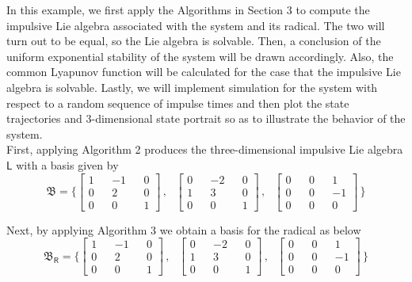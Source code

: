 \documentclass[11pt,a4paper]{article}
\begin{document}
In this example, we first apply the Algorithms in Section 3 to compute the impulsive Lie algebra associated with the system and its radical. The two will turn out to be equal, so the Lie algebra is solvable. Then, a conclusion of the uniform exponential stability of the system will be drawn accordingly. Also, the common Lyapunov function will be calculated for the case that the impulsive Lie algebra is solvable. Lastly, we will implement simulation for the system with respect to a random sequence of impulse times and then plot the state trajectories and 3-dimensional state portrait so as to illustrate the behavior of the system.\\

First, applying Algorithm 2 produces the three-dimensional impulsive Lie algebra $\mathsf{L}$ with a basis given by
$$
\mathfrak{B} = \{ 
	\left[
	\begin{aligned}
	 1 && -1 &&  0  \\
	 0 &&  2 &&  0  \\
	 0 &&  0 &&  1
	\end{aligned}
	\right]\,,
\text{ }		
	\left[
	\begin{aligned}
	 0 && -2 && 0 \\
	 1 && 3 && 0  \\
	 0 && 0 && 1
	\end{aligned}
	\right]\,,
\text{ }		
	\left[
	\begin{aligned}
	 0 && 0 && 1 \\
	 0 && 0 && -1  \\
	 0 && 0 && 0
	\end{aligned}
	\right]\,
	\}
$$

Next, by applying Algorithm 3 we obtain a basis for the radical as below
$$
\mathfrak{B}_\mathsf{R} = \{ 
	\left[
	\begin{aligned}
	 1 && -1 &&  0  \\
	 0 &&  2 &&  0  \\
	 0 &&  0 &&  1
	\end{aligned}
	\right]\,,
\text{ }		
	\left[
	\begin{aligned}
	 0 && -2 && 0 \\
	 1 && 3 && 0  \\
	 0 && 0 && 1
	\end{aligned}
	\right]\,,
\text{ }		
	\left[
	\begin{aligned}
	 0 && 0 && 1 \\
	 0 && 0 && -1  \\
	 0 && 0 && 0
	\end{aligned}
	\right]\,
	\}
$$
\end{document}
